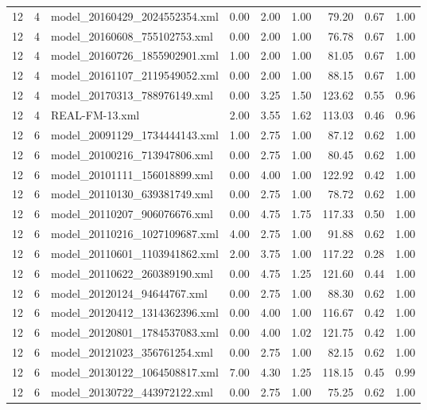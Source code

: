 \begin{table}[ht]
\begin{tabular}{rrlrrrrrr}
   12 &   4 & model\_20160429\_2024552354.xml & 0.00 & 2.00 & 1.00 & 79.20 & 0.67 & 1.00 \\ 
   12 &   4 & model\_20160608\_755102753.xml & 0.00 & 2.00 & 1.00 & 76.78 & 0.67 & 1.00 \\ 
   12 &   4 & model\_20160726\_1855902901.xml & 1.00 & 2.00 & 1.00 & 81.05 & 0.67 & 1.00 \\ 
   12 &   4 & model\_20161107\_2119549052.xml & 0.00 & 2.00 & 1.00 & 88.15 & 0.67 & 1.00 \\ 
   12 &   4 & model\_20170313\_788976149.xml & 0.00 & 3.25 & 1.50 & 123.62 & 0.55 & 0.96 \\ 
   12 &   4 & REAL-FM-13.xml & 2.00 & 3.55 & 1.62 & 113.03 & 0.46 & 0.96 \\ 
   12 &   6 & model\_20091129\_1734444143.xml & 1.00 & 2.75 & 1.00 & 87.12 & 0.62 & 1.00 \\ 
   12 &   6 & model\_20100216\_713947806.xml & 0.00 & 2.75 & 1.00 & 80.45 & 0.62 & 1.00 \\ 
   12 &   6 & model\_20101111\_156018899.xml & 0.00 & 4.00 & 1.00 & 122.92 & 0.42 & 1.00 \\ 
   12 &   6 & model\_20110130\_639381749.xml & 0.00 & 2.75 & 1.00 & 78.72 & 0.62 & 1.00 \\ 
   12 &   6 & model\_20110207\_906076676.xml & 0.00 & 4.75 & 1.75 & 117.33 & 0.50 & 1.00 \\ 
   12 &   6 & model\_20110216\_1027109687.xml & 4.00 & 2.75 & 1.00 & 91.88 & 0.62 & 1.00 \\ 
   12 &   6 & model\_20110601\_1103941862.xml & 2.00 & 3.75 & 1.00 & 117.22 & 0.28 & 1.00 \\ 
   12 &   6 & model\_20110622\_260389190.xml & 0.00 & 4.75 & 1.25 & 121.60 & 0.44 & 1.00 \\ 
   12 &   6 & model\_20120124\_94644767.xml & 0.00 & 2.75 & 1.00 & 88.30 & 0.62 & 1.00 \\ 
   12 &   6 & model\_20120412\_1314362396.xml & 0.00 & 4.00 & 1.00 & 116.67 & 0.42 & 1.00 \\ 
   12 &   6 & model\_20120801\_1784537083.xml & 0.00 & 4.00 & 1.02 & 121.75 & 0.42 & 1.00 \\ 
   12 &   6 & model\_20121023\_356761254.xml & 0.00 & 2.75 & 1.00 & 82.15 & 0.62 & 1.00 \\ 
   12 &   6 & model\_20130122\_1064508817.xml & 7.00 & 4.30 & 1.25 & 118.15 & 0.45 & 0.99 \\ 
   12 &   6 & model\_20130722\_443972122.xml & 0.00 & 2.75 & 1.00 & 75.25 & 0.62 & 1.00 \\ 

\end{tabular}
\end{table}
